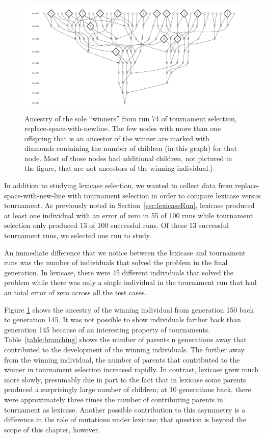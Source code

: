 \begin{figure}
	\vspace{0.6\columnwidth}
	\includegraphics[width=\columnwidth]{figures/ancestors_of_winner_rswn_tourney_run74_9gens.pdf}
	\caption{Ancestry of the sole ``winners'' from run 74 of tournament selection, 
		replace-space-with-newline. The few nodes with more than one offspring that is an ancestor of the winner
		are marked with diamonds containing the number of children (in this graph) for that node. Most of those
		nodes had additional children, not pictured in the figure, that are not ancestors of the winning individual.)}
	\label{fig:winnerAncestorsTourneyRun74}
\end{figure}

In addition to studying lexicase selection, we wanted to collect data from replace-space-with-new-line 
with tournament selection in order to compare lexicase versus tournament. As previously noted in 
Section~\ref{sec:lexicaseRun}, lexicase  produced at least one individual with an error of zero in 
55 of 100 runs while tournament selection only produced 13 of 100 successful runs. Of these 13 
successful tournament runs, we selected one run to study.

An immediate difference that we notice between the lexicase and tournament runs was the number of 
individuals that solved the problem in the final generation. In lexicase, there were 45 different 
individuals that solved the problem while there was only a single individual in the tournament 
run that had an total error of zero across all the test cases.

Figure \ref{fig:winnerAncestorsTourneyRun74} shows the ancestry of the winning individual from 
generation 150 back to generation 145. It was not possible to show individuals farther back than 
generation 145 because of an interesting property of tournaments. Table~\ref{table:branching} shows 
the number of parents n generations away that contributed to the development of the winning individuals. 
The further away from the winning individual, the number of parents that contributed to the winner 
in tournament selection increased rapidly. In contrast, lexicase grew much more slowly, presumably 
due in part to the fact that in lexicase some parents produced a surprisingly large number of children; 
at 10 generations back, there were approximately three times the number of contributing parents in 
tournament as lexicase. Another possible contribution to this asymmetry is a difference in the role of
mutations under lexicase; that question is beyond the scope of this chapter, however.

